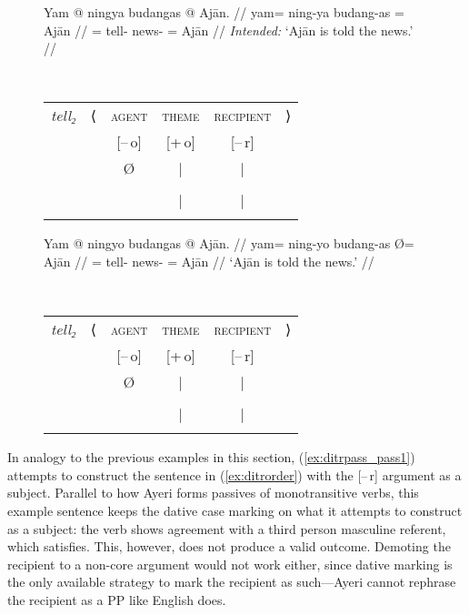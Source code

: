 \begin{figure}
\pex\label{ex:ditrpass}
\a\label{ex:ditrpass_pass1}%
\ljudge*\begin{minipage}[t]{.4\remaining}
\begingl
	\gla Yam @ ningya budangas {} @ Ajān. //
	\glb yam= ning-ya budang-as \Top= Ajān //
	\glc \DatT{}= tell-\TsgM{} news-\Parg{} \Top{}= Ajān //
	\glft \textit{Intended:} `Ajān is told the news.' //
\endgl
\end{minipage}
~
\begin{tabular}[t]{>{\itshape}l l c c c r}
tell₂
	& ⟨
	& \textsc{agent}
	& \textsc{theme}
	& \textsc{recipient}
	& ⟩
	\\
%
	& %
	& [–\,o]
	& [+\,o]
	& [–\,r]
	& %
	\\

%
	& %
	& Ø
	& |
	& |
	& %
	\\

%
	& %
	& %
	& \SObj
	& \Subj*
	& %
	\\

%
	& %
	& %
	& |
	& |
	& %
	\\

%
	& %
	& %
	& \fw{news}
	& \fw{Ajān}
	& %
	\\
\end{tabular}

\a\label{ex:ditrpass_pass2}%
\begin{minipage}[t]{.4\remaining}
\begingl
	\gla Yam @ ningyo budangas {} @ Ajān. //
	\glb yam= ning-yo budang-as Ø= Ajān //
	\glc \DatT{}= tell-\TsgN{} news-\Parg{} \Top{}= Ajān //
	\glft `Ajān is told the news.' //
\endgl
\end{minipage}
~
\begin{tabular}[t]{>{\itshape}l l c c c r}
tell₂
	& ⟨
	& \textsc{agent}
	& \textsc{theme}
	& \textsc{recipient}
	& ⟩
	\\
%
	& %
	& [–\,o]
	& [+\,o]
	& [–\,r]
	& %
	\\

%
	& %
	& Ø
	& |
	& |
	& %
	\\

%
	& %
	& %
	& \Subj
	& \Obj*
	& %
	\\

%
	& %
	& %
	& |
	& |
	& %
	\\

%
	& %
	& %
	& \fw{news}
	& \fw{Ajān}
	& %
	\\
\end{tabular}
\xe
\end{figure}

In analogy to the previous examples in this section, (\ref{ex:ditrpass_pass1})
attempts to construct the sentence in (\ref{ex:ditrorder}) with the [–\,r]
argument as a subject. Parallel to how Ayeri forms passives of monotransitive
verbs, this example sentence keeps the dative case marking on what it attempts
to construct as a subject: the verb shows agreement with a third person
masculine referent, which  satisfies. This, however, does
not produce a valid outcome. Demoting the recipient to a non-core argument
would not work either, since dative marking is the only available strategy to
mark the recipient as such---Ayeri cannot rephrase the recipient as a PP like
English does.

